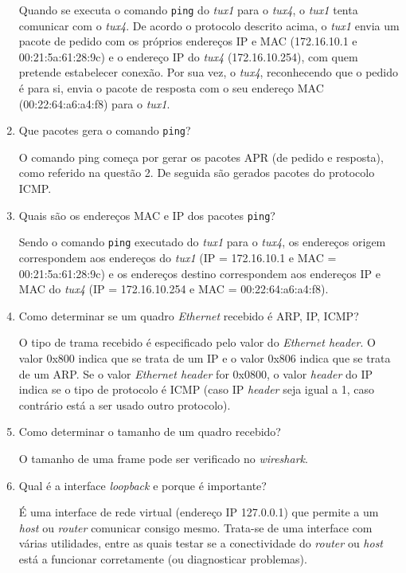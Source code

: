 \documentclass{article}
\begin{document}
\begin{enumerate}
Quando se executa o comando \texttt{ping} do \textit{tux1} para o \textit{tux4}, o \textit{tux1} tenta comunicar com o \textit{tux4}. De acordo o protocolo descrito acima, o \textit{tux1} envia um pacote de pedido com os próprios endereços IP e MAC (172.16.10.1 e 00:21:5a:61:28:9c) e o endereço IP do \textit{tux4} (172.16.10.254), com quem pretende estabelecer conexão. Por sua vez, o \textit{tux4}, reconhecendo que o pedido é para si, envia o pacote de resposta com o seu endereço MAC (00:22:64:a6:a4:f8) para o \textit{tux1}.


\item Que pacotes gera o comando \texttt{ping}?

O comando ping começa por gerar os pacotes APR (de pedido e resposta), como referido na questão 2. De seguida são gerados pacotes do protocolo ICMP.

\item Quais são os endereços MAC e IP dos pacotes \texttt{ping}?

Sendo o comando \texttt{ping} executado do \textit{tux1} para o \textit{tux4}, os endereços origem correspondem aos endereços do \textit{tux1} (IP = 172.16.10.1 e MAC = 00:21:5a:61:28:9c) e os endereços destino correspondem aos endereços IP e MAC do \textit{tux4} (IP = 172.16.10.254 e MAC = 00:22:64:a6:a4:f8).

\item Como determinar se um quadro \textit{Ethernet} recebido é ARP, IP, ICMP?

O tipo de trama recebido é especificado pelo valor do \textit{Ethernet header}. O valor 0x800 indica que se trata de um IP e o valor 0x806 indica que se trata de um ARP.
Se o valor \textit{Ethernet header} for 0x0800, o valor \textit{header} do IP indica se o tipo de protocolo é ICMP (caso IP \textit{header} seja igual a 1, caso contrário está a ser usado outro protocolo).

\item Como determinar o tamanho de um quadro recebido?

O tamanho de uma frame pode ser verificado no \textit{wireshark}.

\item Qual é a interface \textit{loopback} e porque é importante?

É uma interface de rede virtual (endereço IP 127.0.0.1) que permite a um \textit{host} ou \textit{router} comunicar consigo mesmo. Trata-se de uma interface com várias utilidades, entre as quais testar se a conectividade do \textit{router} ou \textit{host} está a funcionar corretamente (ou diagnosticar problemas).
\end{enumerate}
\end{document}
